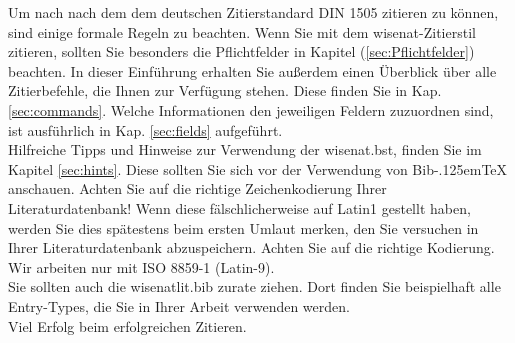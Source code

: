 \documentclass[xlevel, hyperref, nat, mp]{wise}
\newcommand{\bibtex}{\texorpdfstring{Bib\kern-.125em\TeX}{BibTeX}}
\begin{document}




  \tableofcontents

\introduction

Um nach nach dem dem deutschen Zitierstandard DIN 1505 zitieren zu können, sind einige formale Regeln zu beachten. Wenn Sie mit dem wisenat-Zitierstil zitieren, sollten Sie besonders die Pflichtfelder in Kapitel (\ref{sec:Pflichtfelder}) beachten. In dieser Einführung erhalten Sie außerdem einen Überblick über alle Zitierbefehle, die Ihnen zur Verfügung stehen. Diese finden Sie in Kap. \ref{sec:commands}. Welche Informationen den jeweiligen Feldern zuzuordnen sind, ist ausführlich in Kap. \ref{sec:fields} aufgeführt.  \\

Hilfreiche Tipps und Hinweise zur Verwendung der wisenat.bst, finden Sie im Kapitel \ref{sec:hints}. Diese sollten Sie sich vor der Verwendung von \bibtex{} anschauen. Achten Sie auf die richtige Zeichenkodierung Ihrer Literaturdatenbank! Wenn diese fälschlicherweise auf Latin1 gestellt haben, werden Sie dies spätestens beim ersten Umlaut merken, den Sie versuchen in Ihrer Literaturdatenbank abzuspeichern. Achten Sie auf die richtige Kodierung. Wir arbeiten nur mit ISO 8859-1 (Latin-9). \\

Sie sollten auch die wisenatlit.bib zurate ziehen. Dort finden Sie beispielhaft alle Entry-Types, die Sie in Ihrer Arbeit verwenden werden. \\

Viel Erfolg beim erfolgreichen Zitieren. \\
\end{document}
